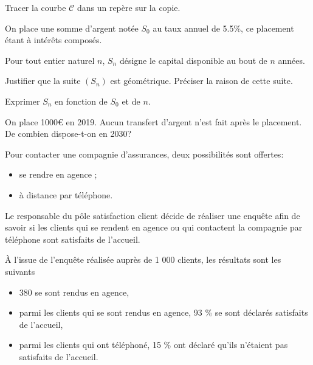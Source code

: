\documentclass[a4paper,12pt]{scrartcl}
\begin{document}
 
 \subquestion{}
 Tracer la courbe $\mathcal{C}$ dans un repère sur la copie. 


On place une somme d'argent notée $S_0$ au taux annuel de 5.5\%, ce placement étant à intérêts composés.

Pour tout entier naturel $n$, $S_n$ désigne le capital disponible au bout de $n$ années.

\question{}
Justifier que la suite $(S_n)$ est géométrique. Préciser la raison de cette suite.


\question{}
Exprimer $S_n$ en fonction de $S_0$ et de $n$.


\question{}
On place 1000\euro{} en 2019. Aucun transfert d'argent n'est fait après le placement. De combien dispose-t-on en 2030?

 
 


Pour contacter une compagnie d'assurances, deux possibilités sont offertes:

\begin{itemize}
\item se rendre en agence ;
\item à distance par téléphone.
\end{itemize}

Le responsable du pôle \og{}satisfaction client\fg{} décide de réaliser une enquête afin de savoir si les clients qui se rendent en agence ou qui contactent la compagnie par téléphone sont satisfaits de l'accueil.

À l'issue de l'enquête réalisée auprès de 1 000 clients, les résultats sont les suivants

\begin{itemize}
\item 380 se sont rendus en agence,
\item parmi les clients qui se sont rendus en agence, 93 \% se sont déclarés satisfaits de l'accueil,
\item parmi les clients qui ont téléphoné, 15 \% ont déclaré qu'ils n'étaient pas satisfaits de l'accueil.
\end{itemize}
\end{document}
